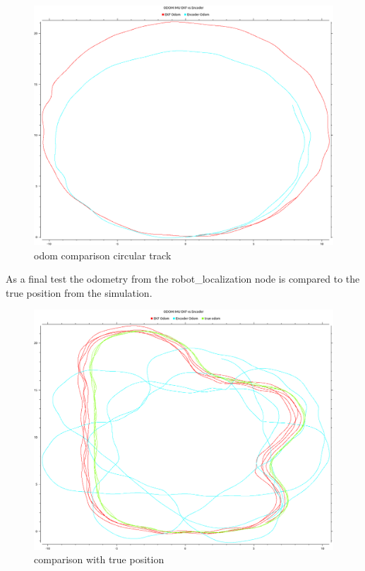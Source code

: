 \begin{figure}[H]
	\includegraphics[width=\textwidth]{Pictures/circle odom}
	\caption{odom comparison circular track}
	\label{circular track}

\end{figure}

As a final test the odometry from the robot\_localization node is compared to the true position from the simulation.

 \begin{figure}[H]
	\includegraphics[width=\textwidth]{Pictures/odom with true}
	\caption{comparison with true position}
	\label{trueodom}
\end{figure}

